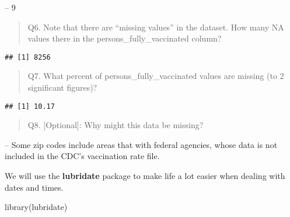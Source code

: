 \documentclass[
]{article}
\newenvironment{Shaded}{\begin{snugshade}}{\end{snugshade}}
\newcommand{\DecValTok}[1]{\textcolor[rgb]{0.00,0.00,0.81}{#1}}
\newcommand{\FunctionTok}[1]{\textcolor[rgb]{0.00,0.00,0.00}{#1}}
\newcommand{\NormalTok}[1]{#1}
\newcommand{\SpecialCharTok}[1]{\textcolor[rgb]{0.00,0.00,0.00}{#1}}
\begin{document}
-- 9

\begin{quote}
Q6. Note that there are ``missing values'' in the dataset. How many NA
values there in the persons\_fully\_vaccinated column?
\end{quote}

\begin{Shaded}
\end{Shaded}

\begin{verbatim}
## [1] 8256
\end{verbatim}

\begin{quote}
Q7. What percent of persons\_fully\_vaccinated values are missing (to 2
significant figures)?
\end{quote}

\begin{Shaded}
\end{Shaded}

\begin{verbatim}
## [1] 10.17
\end{verbatim}

\begin{quote}
Q8. {[}Optional{]}: Why might this data be missing?
\end{quote}

-- Some zip codes include areas that with federal agencies, whose data
is not included in the CDC's vaccination rate file.

We will use the \textbf{lubridate} package to make life a lot easier
when dealing with dates and times.

\begin{Shaded}
\begin{Highlighting}[]
\FunctionTok{library}\NormalTok{(lubridate)}
\end{Highlighting}
\end{Shaded}
\end{document}
